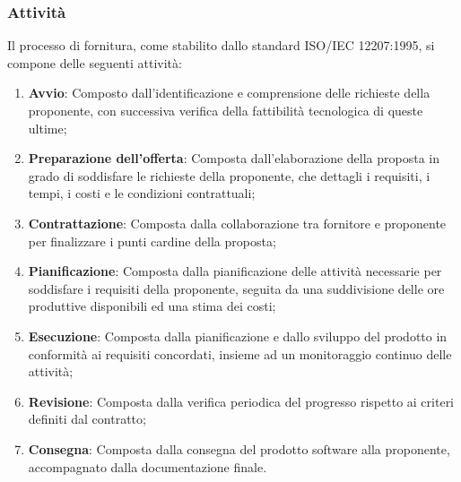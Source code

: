 \documentclass[10pt]{article}
\begin{document}
\begin{justify}
    \subsubsection{Attività}
    Il processo di fornitura, come stabilito dallo standard ISO/IEC 12207:1995, si compone delle seguenti attività:
    \begin{enumerate}
        \item \textbf{Avvio}: Composto dall'identificazione e comprensione delle richieste della proponente, con successiva verifica della fattibilità tecnologica di queste ultime;
        \item \textbf{Preparazione dell'offerta}: Composta dall'elaborazione della proposta in grado di soddisfare le richieste della proponente, che dettagli i requisiti, i tempi, i costi e le condizioni contrattuali;
        \item \textbf{Contrattazione}: Composta dalla collaborazione tra fornitore e proponente per finalizzare i punti cardine della proposta;
        \item \textbf{Pianificazione}: Composta dalla pianificazione delle attività necessarie per soddisfare i requisiti della proponente, seguita da una suddivisione delle ore produttive disponibili ed una stima dei costi;
        \item \textbf{Esecuzione}: Composta dalla pianificazione e dallo sviluppo del prodotto in conformità ai requisiti concordati, insieme ad un monitoraggio continuo delle attività;
        \item \textbf{Revisione}: Composta dalla verifica periodica del progresso rispetto ai criteri definiti dal contratto;
        \item \textbf{Consegna}: Composta dalla consegna del prodotto software alla proponente, accompagnato dalla documentazione finale.
    \end{enumerate}


\end{justify}
\end{document}
